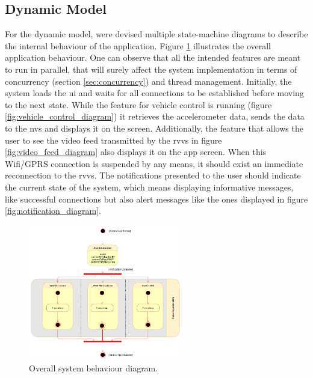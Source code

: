 \subsection{Dynamic Model}
For the dynamic model, were devised multiple state-machine diagrams to describe the internal behaviour of the application. 
%
Figure \ref{fig:overall_system_diagram} illustrates the overall application behaviour. One can observe that all the intended features are meant to run in parallel, that will surely affect the system implementation in terms of concurrency (section \ref{sec:concurrency}) and thread management.
%
Initially, the system loads the \gls{ui} and waits for all connections to be established before moving to the next state.
%
While the feature for vehicle control is running (figure \ref{fig:vehicle_control_diagram}) it retrieves the accelerometer data, sends the data to the \gls{nvs} and displays it on the screen.
%
Additionally, the feature that allows the user to see the video feed transmitted by the \gls{rvvs} in figure \ref{fig:video_feed_diagram} also displays it on the app screen. When this Wifi/GPRS connection is suspended by any means, it should exist an immediate reconnection to the \gls{rvvs}.
%
The notifications presented to the user should indicate the current state of the system, which means displaying informative messages, like successful connections but also alert messages like the ones displayed in figure \ref{fig:notification_diagram}.
%
\begin{figure}[!ht]
\centering
\includegraphics[width=0.6\textwidth]{img/overall_system_sm.png}
\caption{\label{fig:overall_system_diagram}Overall system behaviour diagram.}
\end{figure}
%
